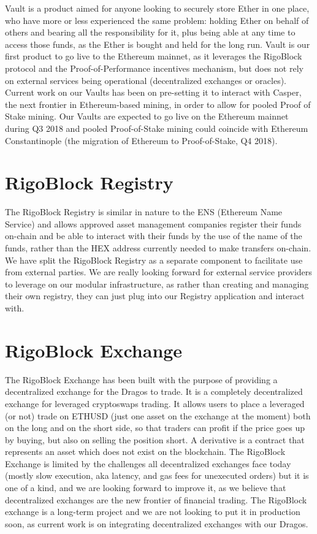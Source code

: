 \documentclass[9pt,oneside]{amsart}
\begin{document}
\begin{multicols}{2}
Vault is a product aimed for anyone looking to securely store Ether in one place, who have more or less experienced the same problem: holding Ether on behalf of others and bearing all the responsibility for it, plus being able at any time to access those funds, as the Ether is bought and held for the long run.
Vault is our first product to go live to the Ethereum mainnet, as it leverages the RigoBlock protocol and the Proof-of-Performance incentives mechanism, but does not rely on external services being operational (decentralized exchanges or oracles). Current work on our Vaults has been on pre-setting it to interact with Casper, the next frontier in Ethereum-based mining, in order to allow for pooled Proof of Stake mining. Our Vaults are expected to go live on the Ethereum mainnet during Q3 2018 and pooled Proof-of-Stake mining could coincide with Ethereum Constantinople (the migration of Ethereum to Proof-of-Stake, Q4 2018).

\section{RigoBlock Registry}
The RigoBlock Registry is similar in nature to the ENS (Ethereum Name Service) and allows approved asset management companies register their funds on-chain and be able to interact with their funds by the use of the name of the funds, rather than the HEX address currently needed to make transfers on-chain. We have split the RigoBlock Registry as a separate component to facilitate use from external parties. We are really looking forward for external service providers to leverage on our modular infrastructure, as rather than creating and managing their own registry, they can just plug into our Registry application and interact with.

\section{RigoBlock Exchange}
The RigoBlock Exchange has been built with the purpose of providing a decentralized exchange for the Dragos to trade. It is a completely decentralized exchange for leveraged cryptoswaps trading. It allows users to place a leveraged (or not) trade on ETHUSD (just one asset on the exchange at the moment) both on the long and on the short side, so that traders can profit if the price goes up by buying, but also on selling the position short. A derivative is a contract that represents an asset which does not exist on the blockchain.
The RigoBlock Exchange is limited by the challenges all decentralized exchanges face today (mostly slow execution, aka latency, and gas fees for unexecuted orders) but it is one of a kind, and we are looking forward to improve it, as we believe that decentralized exchanges are the new frontier of financial trading. The RigoBlock exchange is a long-term project and we are not looking to put it in production soon, as current work is on integrating decentralized exchanges with our Dragos.


\end{multicols}
\end{document}
